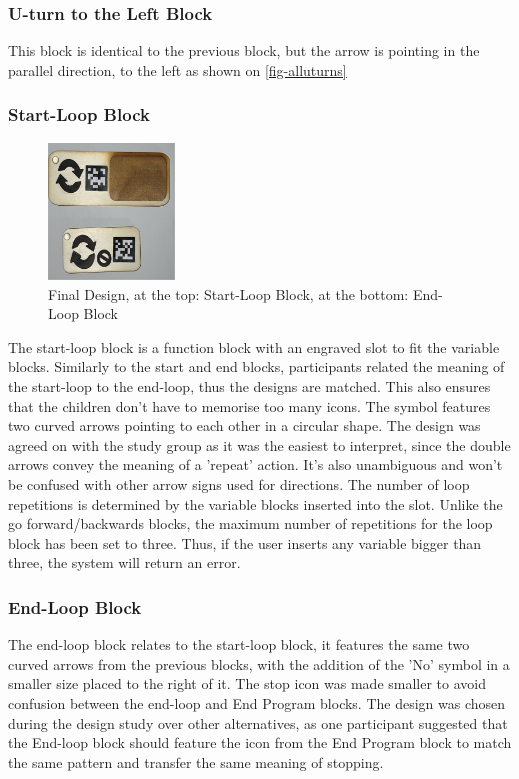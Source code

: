 \documentclass[oneside,%
                    author={Malak Hajji},
                    degree={BSc},
                    title={Designing An Accessible Ozobot Programming Platform for Students},
                  subtitle={With Mixed Visual Abilities}]{dissertation}
\begin{document}
\subsubsection{U-turn to the Left Block}
This block is identical to the previous block, but the arrow is pointing in the parallel direction, to the left as shown on \ref{fig-alluturns}

\subsubsection{Start-Loop Block}
\FloatBarrier
\begin{figure}[h]
    \centering
    \includegraphics[width=0.3\textwidth]{thesis/startandendloop.eps}
    \caption{Final Design, at the top: Start-Loop Block, at the bottom: End-Loop Block}
    \label{fig-startandendloop}
\end{figure}
\FloatBarrier
The start-loop block is a function block with an engraved slot to fit the variable blocks. Similarly to the start and end blocks, participants related the meaning of the start-loop to the end-loop, thus the designs are matched. This also ensures that the children don't have to memorise too many icons. The symbol features two curved arrows pointing to each other in a circular shape. The design was agreed on with the study group as it was the easiest to interpret, since the double arrows convey the meaning of a 'repeat' action. It's also unambiguous and won't be confused with other arrow signs used for directions. The number of loop repetitions is determined by the variable blocks inserted into the slot. Unlike the go forward/backwards blocks, the maximum number of repetitions for the loop block has been set to three. Thus, if the user inserts any variable bigger than three, the system will return an error.

\subsubsection{End-Loop Block}
The end-loop block relates to the start-loop block, it features the same two curved arrows from the previous blocks, with the addition of the 'No' symbol in a smaller size placed to the right of it. The stop icon was made smaller to avoid confusion between the end-loop and End Program blocks. The design was chosen during the design study over other alternatives, as one participant suggested that the End-loop block should feature the icon from the End Program block to match the same pattern and transfer the same meaning of stopping. 
\end{document}

